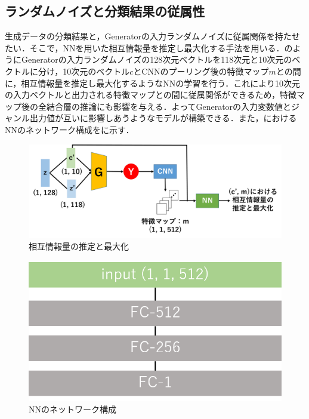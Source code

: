 \subsection{ランダムノイズと分類結果の従属性}
生成データの分類結果と，Generatorの入力ランダムノイズに従属関係を持たせたい．そこで，NNを用いた相互情報量を推定し最大化する手法を用いる．のようにGeneratorの入力ランダムノイズの128次元ベクトルを118次元と10次元のベクトルに分け，10次元のベクトル$c$とCNNのプーリング後の特徴マップ$m$との間に，相互情報量を推定し最大化するようなNNの学習を行う．これにより10次元の入力ベクトルと出力される特徴マップとの間に従属関係ができるため，特徴マップ後の全結合層の推論にも影響を与える．よってGeneratorの入力変数値とジャンル出力値が互いに影響しあうようなモデルが構築できる．また，におけるNNのネットワーク構成をに示す．
\begin{figure}[htbp]
	\begin{center}
		\includegraphics[scale=0.68]{./images/generate-model/continuous_gan.png}
		\caption{相互情報量の推定と最大化}
		\label{fig:continuous}
	\end{center}
\end{figure}
\begin{figure}[htbp]
	\begin{center}
		\includegraphics[scale=0.48]{./images/generate-model/continuous.png}
		\caption{NNのネットワーク構成}
		\label{fig:network-continuous}
	\end{center}
\end{figure}


